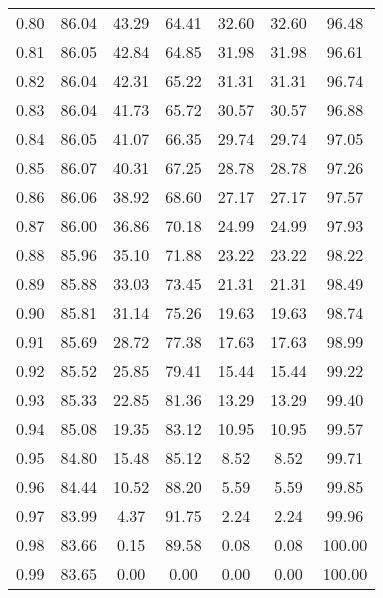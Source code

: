 \begin{tabular}{|c|c|c|c|c|c|c|}
      0.80 &     86.04 &     43.29 &      64.41 &   32.60 &      32.60 &         96.48 \\
      0.81 &     86.05 &     42.84 &      64.85 &   31.98 &      31.98 &         96.61 \\
      0.82 &     86.04 &     42.31 &      65.22 &   31.31 &      31.31 &         96.74 \\
      0.83 &     86.04 &     41.73 &      65.72 &   30.57 &      30.57 &         96.88 \\
      0.84 &     86.05 &     41.07 &      66.35 &   29.74 &      29.74 &         97.05 \\
      0.85 &     86.07 &     40.31 &      67.25 &   28.78 &      28.78 &         97.26 \\
      0.86 &     86.06 &     38.92 &      68.60 &   27.17 &      27.17 &         97.57 \\
      0.87 &     86.00 &     36.86 &      70.18 &   24.99 &      24.99 &         97.93 \\
      0.88 &     85.96 &     35.10 &      71.88 &   23.22 &      23.22 &         98.22 \\
      0.89 &     85.88 &     33.03 &      73.45 &   21.31 &      21.31 &         98.49 \\
      0.90 &     85.81 &     31.14 &      75.26 &   19.63 &      19.63 &         98.74 \\
      0.91 &     85.69 &     28.72 &      77.38 &   17.63 &      17.63 &         98.99 \\
      0.92 &     85.52 &     25.85 &      79.41 &   15.44 &      15.44 &         99.22 \\
      0.93 &     85.33 &     22.85 &      81.36 &   13.29 &      13.29 &         99.40 \\
      0.94 &     85.08 &     19.35 &      83.12 &   10.95 &      10.95 &         99.57 \\
      0.95 &     84.80 &     15.48 &      85.12 &    8.52 &       8.52 &         99.71 \\
      0.96 &     84.44 &     10.52 &      88.20 &    5.59 &       5.59 &         99.85 \\
      0.97 &     83.99 &      4.37 &      91.75 &    2.24 &       2.24 &         99.96 \\
      0.98 &     83.66 &      0.15 &      89.58 &    0.08 &       0.08 &        100.00 \\
      0.99 &     83.65 &      0.00 &       0.00 &    0.00 &       0.00 &        100.00 \\
\bottomrule
\end{tabular}
